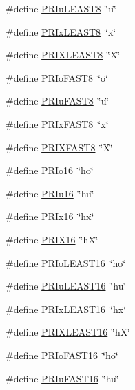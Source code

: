 \begin{DoxyCompactItemize}
\#define \hyperlink{a00113_a74cb15b101649124009c010a9055e885}{P\+R\+Iu\+L\+E\+A\+S\+T8}~\char`\"{}u\char`\"{}
\item 
\#define \hyperlink{a00113_a45d80a42b6cd25f3ed57b0e800e6e398}{P\+R\+Ix\+L\+E\+A\+S\+T8}~\char`\"{}x\char`\"{}
\item 
\#define \hyperlink{a00113_a70aa3faf72084587fb18d03aa033a212}{P\+R\+I\+X\+L\+E\+A\+S\+T8}~\char`\"{}X\char`\"{}
\item 
\#define \hyperlink{a00113_a37f93445f1795033c9ba577661da6a91}{P\+R\+Io\+F\+A\+S\+T8}~\char`\"{}o\char`\"{}
\item 
\#define \hyperlink{a00113_a0b0c7ad693c391e3e353e8f2d1df2ec3}{P\+R\+Iu\+F\+A\+S\+T8}~\char`\"{}u\char`\"{}
\item 
\#define \hyperlink{a00113_ae7e1780719eb0e4b2826a0da06255780}{P\+R\+Ix\+F\+A\+S\+T8}~\char`\"{}x\char`\"{}
\item 
\#define \hyperlink{a00113_ab153efc9e6547ca56f42de767cde2595}{P\+R\+I\+X\+F\+A\+S\+T8}~\char`\"{}X\char`\"{}
\item 
\#define \hyperlink{a00113_a55494a16151668ea78e0b808ef38c8c1}{P\+R\+Io16}~\char`\"{}ho\char`\"{}
\item 
\#define \hyperlink{a00113_a86bc00ee87e8e40787e0681fc34c576a}{P\+R\+Iu16}~\char`\"{}hu\char`\"{}
\item 
\#define \hyperlink{a00113_a70f5e38b517f714518c970a4da37bef1}{P\+R\+Ix16}~\char`\"{}hx\char`\"{}
\item 
\#define \hyperlink{a00113_a570ca9af5087023f75fc8a1a602d26ab}{P\+R\+I\+X16}~\char`\"{}hX\char`\"{}
\item 
\#define \hyperlink{a00113_a1ecbd31333b358c22423a541fffbd122}{P\+R\+Io\+L\+E\+A\+S\+T16}~\char`\"{}ho\char`\"{}
\item 
\#define \hyperlink{a00113_aa3ba696eef7c107c76c26eea76dcb4b4}{P\+R\+Iu\+L\+E\+A\+S\+T16}~\char`\"{}hu\char`\"{}
\item 
\#define \hyperlink{a00113_ad00e2a12b813425800cad731f61497ae}{P\+R\+Ix\+L\+E\+A\+S\+T16}~\char`\"{}hx\char`\"{}
\item 
\#define \hyperlink{a00113_afa4303b077ae4c6c58686178e4b90d18}{P\+R\+I\+X\+L\+E\+A\+S\+T16}~\char`\"{}hX\char`\"{}
\item 
\#define \hyperlink{a00113_a3eda49c829de683e701eaed3cbaf0e73}{P\+R\+Io\+F\+A\+S\+T16}~\char`\"{}ho\char`\"{}
\item 
\#define \hyperlink{a00113_aa82e218a186691ebf7149b36746c12e7}{P\+R\+Iu\+F\+A\+S\+T16}~\char`\"{}hu\char`\"{}
\item 

\end{DoxyCompactItemize}
